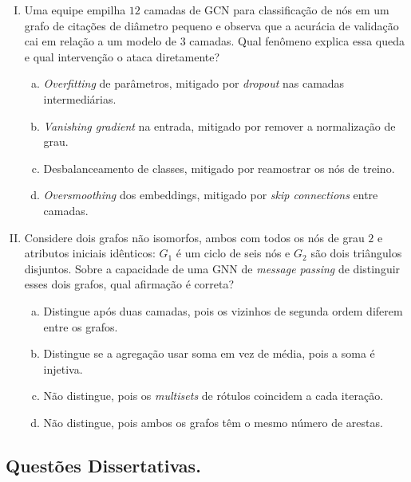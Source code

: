 \documentclass{dlproblemset}
\begin{document}
\begin{enumerate}[I)]
    \item Uma equipe empilha $12$ camadas de GCN para classificação de nós em um grafo de citações de diâmetro pequeno e observa que a acurácia de validação cai em relação a um modelo de $3$ camadas. Qual fenômeno explica essa queda e qual intervenção o ataca diretamente?
    \begin{enumerate}[(a)]
        \item \textit{Overfitting} de parâmetros, mitigado por \textit{dropout} nas camadas intermediárias.
        \item \textit{Vanishing gradient} na entrada, mitigado por remover a normalização de grau.
        \item Desbalanceamento de classes, mitigado por reamostrar os nós de treino.
        \item \textit{Oversmoothing} dos embeddings, mitigado por \textit{skip connections} entre camadas.
    \end{enumerate}

    \item {} Considere dois grafos não isomorfos, ambos com todos os nós de grau $2$ e atributos iniciais idênticos: $G_1$ é um ciclo de seis nós e $G_2$ são dois triângulos disjuntos. Sobre a capacidade de uma GNN de \textit{message passing} de distinguir esses dois grafos, qual afirmação é correta?
    \begin{enumerate}[(a)]
        \item Distingue após duas camadas, pois os vizinhos de segunda ordem diferem entre os grafos.
        \item Distingue se a agregação usar soma em vez de média, pois a soma é injetiva.
        \item Não distingue, pois os \textit{multisets} de rótulos coincidem a cada iteração.
        \item Não distingue, pois ambos os grafos têm o mesmo número de arestas.
    \end{enumerate}

\end{enumerate}

\subsection*{Questões Dissertativas.}
\end{document}
